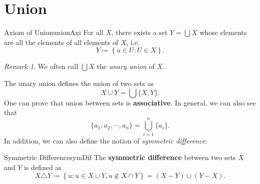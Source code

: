 \documentclass[math]{amznotes}
\theoremstyle{remark}
\newtheorem*{remark}{Remark}
\begin{document}
\section{Union}
\begin{axibox}{Axiom of Union}{unionAxi}
    For all $X$, there exists a set $Y = \bigcup X$ whose elements are all the elements of all elements of $X$, i.e.
    \begin{displaymath}
        Y \coloneqq \left\{u \in U \colon U \in X\right\}.
    \end{displaymath}
\end{axibox}
\begin{notebox}
    \begin{remark}
        We often call $\bigcup X$ the \textit{unary union} of $X$.
    \end{remark}
\end{notebox}
The unary union defines the union of two sets as 
\begin{equation*}
    X \cup Y = \bigcup\{X, Y\}.
\end{equation*}
One can prove that union between sets is \textbf{associative}. In general, we can also see that
\begin{equation*}
    \{a_1, a_2, \cdots, a_n\} = \bigcup_{i = 1}^n \{a_i\}.
\end{equation*}
In addition, we can also define the notion of \textit{symmetric difference}:
\begin{dfnbox}{Symmetric Difference}{symDif}
    The {\color{red} \textbf{symmetric difference}} between two sets $X$ and $Y$ is defined as 
    \begin{displaymath}
        X \triangle Y \coloneqq \left\{u \colon u \in X \cup Y, u \notin X \cap Y\right\} = (X - Y) \cup (Y - X).
    \end{displaymath}
\end{dfnbox}
\end{document}

